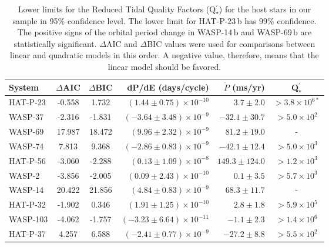 \documentclass[a4paper,fleqn,usenatbib]{mnras}
\begin{document}
\begin{table*}
\centering
\caption{Lower limits for the Reduced Tidal Quality Factors (Q$_{\star}^{\prime}$) for the host stars in our sample in 95\% confidence level. The lower limit for HAT-P-23\,b has 99\% confidence. The positive signs of the orbital period change in WASP-14\,b and WASP-69\,b are statistically significant. $\Delta$AIC and  $\Delta$BIC values were used for comparisons between linear and quadratic models in this order. A negative value, therefore, means that the linear model should be favored.}
\label{tab:tidal_quality_factors}
\begin{tabular}{lccrrc}  
\hline
\hline
System & $\Delta$AIC & $\Delta$BIC & dP/dE (days/cycle) & $\dot{P}$ (ms/yr) & Q$_{\star}^{\prime}$ \\
\hline
HAT-P-23 & -0.558  & 1.732  & $(1.44 \pm 0.75) \times 10^{-10}$ &  $3.7 \pm 2.0 $ & $> 3.8 \times 10^{6 *}$ \\
WASP-37 & -2.316  & -1.831 & $(-3.64 \pm 3.48) \times 10^{-9}$ & $-32.1 \pm 30.7$ & $> 5.0 \times 10^2$  \\
WASP-69 & 17.987  & 18.472 & $(9.96 \pm 2.32) \times 10^{-9}$ & $81.2 \pm 19.0$ &  -  \\
WASP-74 & 7.813  & 9.368 & $(-2.86 \pm 0.83) \times 10^{-9}$ & $-42.1 \pm 12.4$ & $> 5.0 \times 10^{3}$  \\
HAT-P-56 & -3.060  & -2.288  & $(0.13 \pm 1.09) \times 10^{-8}$ & $149.3 \pm 124.0$  & $> 1.2 \times 10^3$ \\
WASP-2 & -3.856  & -2.005 & $(0.09 \pm 2.43) \times 10^{-10}$ & $0.1 \pm  3.5$ & $> 5.7 \times 10^3$  \\
WASP-14 & 20.422  & 21.856 & $(4.84 \pm 0.83) \times 10^{-9}$ & $68.3 \pm  11.7$ & -  \\
HAT-P-32 & -1.902  & 0.346 & $(1.91 \pm 1.25) \times 10^{-10}$ & $2.8 \pm 1.8$ & $> 5.9 \times 10^5$   \\
WASP-103 & -4.062 & -1.757 & $(-3.23 \pm 6.64) \times 10^{-11}$ & $-1.1 \pm 2.3$ & $> 1.4 \times 10^6$ \\
HAT-P-37 & 4.257 & 6.588 & $(-2.41 \pm 0.77) \times 10^{-9}$ & $-27.2 \pm 8.8$ & $> 5.5 \times 10^2$  \\
\hline
\end{tabular}
\end{table*}
\end{document}
